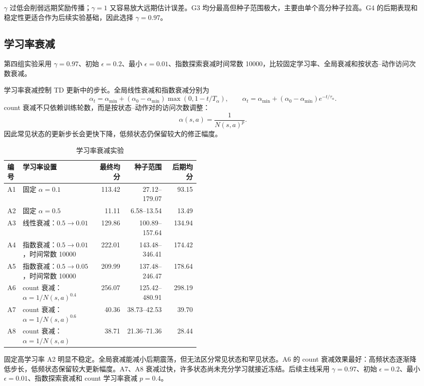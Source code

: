 \documentclass{zjureport}
\begin{document}
$\gamma$ 过低会削弱远期奖励传播；$\gamma=1$ 又容易放大远期估计误差。G3 均分最高但种子范围极大，主要由单个高分种子拉高。G4 的后期表现和稳定性更适合作为后续实验基础，因此选择 $\gamma=0.97$。

\subsection{学习率衰减}

第四组实验采用 $\gamma=0.97$、初始 $\epsilon=0.2$、最小 $\epsilon=0.01$、指数探索衰减时间常数 10000，比较固定学习率、全局衰减和按状态--动作访问次数衰减。

学习率衰减控制 TD 更新中的步长。全局线性衰减和指数衰减分别为
\[
\alpha_t=\alpha_{\min}+(\alpha_0-\alpha_{\min})\max(0,1-t/T_\alpha),
\qquad
\alpha_t=\alpha_{\min}+(\alpha_0-\alpha_{\min})e^{-t/\tau_\alpha}.
\]
count 衰减不只依赖训练轮数，而是按状态--动作对的访问次数调整：
\[
\alpha(s,a)=\frac{1}{N(s,a)^p}.
\]
因此常见状态的更新步长会更快下降，低频状态仍保留较大的修正幅度。

\begin{table}[H]
    \centering
    \small
    \caption{学习率衰减实验}
    \label{tab:alpha-decay}
    \begin{tabular}{p{0.08\linewidth}p{0.38\linewidth}rrr}
        \toprule
        编号 & 学习率设置 & 最终均分 & 种子范围 & 后期均分 \\
        \midrule
        A1 & 固定 $\alpha=0.1$ & 113.42 & 27.12--179.07 & 93.15 \\
        A2 & 固定 $\alpha=0.5$ & 11.11 & 6.58--13.54 & 13.49 \\
        A3 & 线性衰减：$0.5\rightarrow0.01$ & 129.86 & 100.89--157.64 & 134.94 \\
        A4 & 指数衰减：$0.5\rightarrow0.01$，时间常数 10000 & 222.01 & 143.48--346.41 & 174.42 \\
        A5 & 指数衰减：$0.5\rightarrow0.05$，时间常数 10000 & 209.99 & 137.48--246.47 & 178.64 \\
        A6 & count 衰减：$\alpha=1/N(s,a)^{0.4}$ & 256.07 & 125.42--480.91 & 298.19 \\
        A7 & count 衰减：$\alpha=1/N(s,a)^{0.6}$ & 40.36 & 38.73--42.53 & 39.70 \\
        A8 & count 衰减：$\alpha=1/N(s,a)$ & 38.71 & 21.36--71.36 & 28.44 \\
        \bottomrule
    \end{tabular}
\end{table}

固定高学习率 A2 明显不稳定。全局衰减能减小后期震荡，但无法区分常见状态和罕见状态。A6 的 count 衰减效果最好：高频状态逐渐降低步长，低频状态保留较大更新幅度。A7、A8 衰减过快，许多状态尚未充分学习就接近冻结。后续主线采用 $\gamma=0.97$、初始 $\epsilon=0.2$、最小 $\epsilon=0.01$、指数探索衰减和 count 学习率衰减 $p=0.4$。
\end{document}
